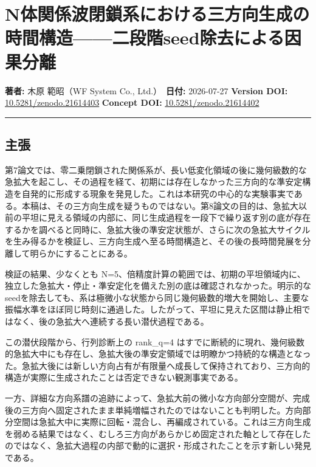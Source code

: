 \documentclass[
  a4paper,
]{ltjsarticle}
\author{}
\date{}
\begin{document}
\section{N体関係波閉鎖系における三方向生成の時間構造------二段階seed除去による因果分離}\label{nux4f53ux95a2ux4fc2ux6ce2ux9589ux9396ux7cfbux306bux304aux3051ux308bux4e09ux65b9ux5411ux751fux6210ux306eux6642ux9593ux69cbux9020ux4e8cux6bb5ux968eseedux9664ux53bbux306bux3088ux308bux56e0ux679cux5206ux96e2}

\textbf{著者:} 木原 範昭（WF System Co., Ltd.）　\textbf{日付:}
2026-07-27 \textbf{Version DOI:}
\href{https://doi.org/10.5281/zenodo.21614403}{10.5281/zenodo.21614403}
\textbf{Concept DOI:}
\href{https://doi.org/10.5281/zenodo.21614402}{10.5281/zenodo.21614402}

\begin{center}\rule{0.5\linewidth}{0.5pt}\end{center}

\subsection{主張}\label{ux4e3bux5f35}

第7論文では、零二乗閉鎖された関係系が、長い低変化領域の後に幾何級数的な急拡大を起こし、その過程を経て、初期には存在しなかった三方向的な準安定構造を自発的に形成する現象を発見した。これは本研究の中心的な実験事実である。本稿は、その三方向生成を疑うものではない。第8論文の目的は、急拡大以前の平坦に見える領域の内部に、同じ生成過程を一段下で繰り返す別の底が存在するかを調べると同時に、急拡大後の準安定状態が、さらに次の急拡大サイクルを生み得るかを検証し、三方向生成へ至る時間構造と、その後の長時間発展を分離して明らかにすることにある。

検証の結果、少なくとも
N=5、倍精度計算の範囲では、初期の平坦領域内に、独立した急拡大・停止・準安定化を備えた別の底は確認されなかった。明示的なseedを除去しても、系は極微小な状態から同じ幾何級数的増大を開始し、主要な振幅水準をほぼ同じ時刻に通過した。したがって、平坦に見えた区間は静止相ではなく、後の急拡大へ連続する長い潜伏過程である。

この潜伏段階から、行列診断上の rank\_q=4
はすでに断続的に現れ、幾何級数的急拡大中にも存在し、急拡大後の準安定領域では明瞭かつ持続的な構造となった。急拡大後には新しい方向占有が有限量へ成長して保持されており、三方向的構造が実際に生成されたことは否定できない観測事実である。

一方、詳細な方向系譜の追跡によって、急拡大前の微小な方向部分空間が、完成後の三方向へ固定されたまま単純増幅されたのではないことも判明した。方向部分空間は急拡大中に実際に回転・混合し、再編成されている。これは三方向生成を弱める結果ではなく、むしろ三方向があらかじめ固定された軸として存在したのではなく、急拡大過程の内部で動的に選択・形成されたことを示す新しい発見である。
\end{document}
